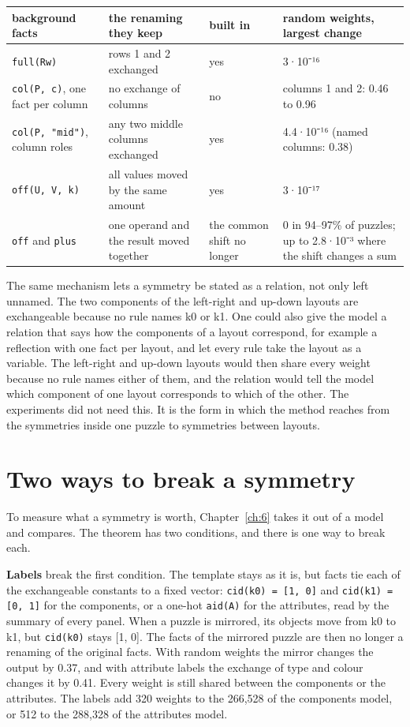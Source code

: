 \begin{center}\small
\begin{tabularx}{\linewidth}{@{}YYYY@{}}
\toprule
background facts & the renaming they keep & built in & random weights, largest change \\
\midrule
\texttt{full(Rw)} & rows 1 and 2 exchanged & yes & 3·10⁻¹⁶ \\
\texttt{col(P, c)}, one fact per column & no exchange of columns & no & columns 1 and 2: 0.46 to 0.96 \\
\texttt{col(P, "mid")}, column roles & any two middle columns exchanged & yes & 4.4·10⁻¹⁶ (named columns: 0.38) \\
\texttt{off(U, V, k)} & all values moved by the same amount & yes & 3·10⁻¹⁷ \\
\texttt{off} and \texttt{plus} & one operand and the result moved together & the common shift no longer & 0 in 94–97\% of puzzles; up to 2.8·10⁻³ where the shift changes a sum \\
\bottomrule
\end{tabularx}
\end{center}

The same mechanism lets a symmetry be stated as a relation, not only left unnamed. The two components of the left-right and up-down layouts are exchangeable because no rule names k0 or k1. One could also give the model a relation that says how the components of a layout correspond, for example a reflection with one fact per layout, and let every rule take the layout as a variable. The left-right and up-down layouts would then share every weight because no rule names either of them, and the relation would tell the model which component of one layout corresponds to which of the other. The experiments did not need this. It is the form in which the method reaches from the symmetries inside one puzzle to symmetries between layouts.

\section{Two ways to break a symmetry}\label{sec:3.4}

To measure what a symmetry is worth, Chapter~\ref{ch:6} takes it out of a model and compares. The theorem has two conditions, and there is one way to break each.

\textbf{Labels} break the first condition. The template stays as it is, but facts tie each of the exchangeable constants to a fixed vector: \texttt{cid(k0) = [1, 0]} and \texttt{cid(k1) = [0, 1]} for the components, or a one-hot \texttt{aid(A)} for the attributes, read by the summary of every panel. When a puzzle is mirrored, its objects move from k0 to k1, but \texttt{cid(k0)} stays [1, 0]. The facts of the mirrored puzzle are then no longer a renaming of the original facts. With random weights the mirror changes the output by 0.37, and with attribute labels the exchange of type and colour changes it by 0.41. Every weight is still shared between the components or the attributes. The labels add 320 weights to the 266,528 of the components model, or 512 to the 288,328 of the attributes model.

